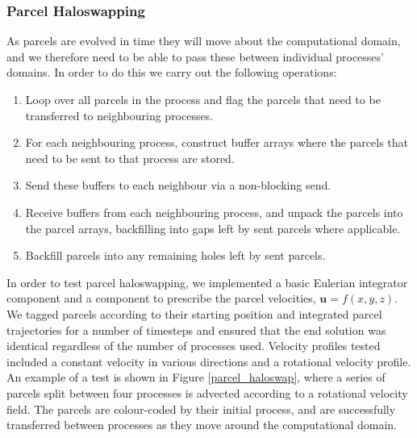 \documentclass{article}
\renewcommand{\v}[1]{\ensuremath{\mathbf{#1}}} %
\begin{document}
\subsubsection{Parcel Haloswapping}\label{parcel_haloswapping}
As parcels are evolved in time they will move about the computational domain, and we therefore need to be able to pass these between individual processes' domains. In order to do this we carry out the following operations:
\begin{enumerate}
  \item Loop over all parcels in the process and flag the parcels that need to be transferred to neighbouring processes.
  \item For each neighbouring process, construct buffer arrays where the parcels that need to be sent to that process are stored.
  \item Send these buffers to each neighbour via a non-blocking send.
  \item Receive buffers from each neighbouring process, and unpack the parcels into the parcel arrays, backfilling into gaps left by sent parcels where applicable.
  \item Backfill parcels into any remaining holes left by sent parcels.
\end{enumerate}

In order to test parcel haloswapping, we implemented a basic Eulerian integrator component and a component to prescribe the parcel velocities, $\v{u} = f(x,y,z)$. We tagged parcels according to their starting position and integrated parcel trajectories for a number of timesteps and ensured that the end solution was identical regardless of the number of processes used. Velocity profiles tested included a constant velocity in various directions and a rotational velocity profile. An example of a test is shown in Figure \ref{parcel_haloswap}, where a series of parcels split between four processes is advected according to a rotational velocity field. The parcels are colour-coded by their initial process, and are successfully transferred between processes as they move around the computational domain.
\end{document}
